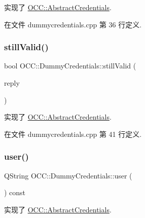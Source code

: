 实现了 \hyperlink{class_o_c_c_1_1_abstract_credentials_a77adad4957e0365be40db7fe4499a86b}{O\+C\+C\+::\+Abstract\+Credentials}.



在文件 dummycredentials.\+cpp 第 36 行定义.

\mbox{\label{class_o_c_c_1_1_dummy_credentials_ad5076e854fcbf690689da685002a01a0}} 
\subsubsection{\texorpdfstring{still\+Valid()}{stillValid()}}
{\footnotesize\ttfamily bool O\+C\+C\+::\+Dummy\+Credentials\+::still\+Valid (\begin{DoxyParamCaption}\item[{Q\+Network\+Reply $\ast$}]{reply }\end{DoxyParamCaption})\hspace{0.3cm}{\ttfamily [virtual]}}



实现了 \hyperlink{class_o_c_c_1_1_abstract_credentials_a13eca92c3c27886aecd39c6912b7e225}{O\+C\+C\+::\+Abstract\+Credentials}.



在文件 dummycredentials.\+cpp 第 41 行定义.

\mbox{\label{class_o_c_c_1_1_dummy_credentials_a98ae82a333546d10928308dd31b78cf6}} 
\subsubsection{\texorpdfstring{user()}{user()}}
{\footnotesize\ttfamily Q\+String O\+C\+C\+::\+Dummy\+Credentials\+::user (\begin{DoxyParamCaption}{ }\end{DoxyParamCaption}) const\hspace{0.3cm}{\ttfamily [virtual]}}



实现了 \hyperlink{class_o_c_c_1_1_abstract_credentials_a8d96306a2d4af6c6dcffaa0b7c5b46f8}{O\+C\+C\+::\+Abstract\+Credentials}.



